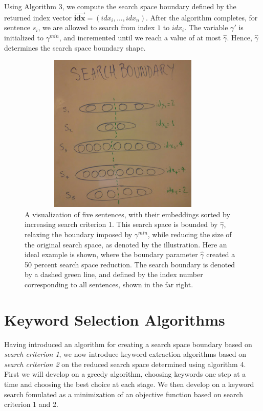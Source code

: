 \documentclass[12pt]{article}
\begin{document}
Using Algorithm 3, we compute the search space boundary defined by the returned index vector $\bm{\vec{idx}} = (idx_i, ..., idx_n)$. After the algorithm completes, for sentence $s_i$,  we are allowed to search from index $1$ to $idx_i$.
The variable $\gamma\prime$ is initialized to $\gamma^{min}$, and incremented until we reach a value of at most $\hat{\gamma}$. Hence, $\hat{\gamma}$ determines the search space boundary shape.

\begin{figure}[H]
\centering
\includegraphics[height=3in, width=4in]{Images/SearchBoundary.png}
\caption{A visualization of five sentences, with their embeddings sorted by increasing search criterion 1. This search space is bounded by $\hat{\gamma}$, relaxing the boundary imposed by $\gamma^{min}$, while reducing the size of the original search space, as denoted by the illustration. Here an ideal example is shown, where the boundary parameter $\hat{\gamma}$ created a 50 percent search space reduction. The search boundary is denoted by a dashed green line, and defined by the index number corresponding to all sentences, shown in the far right.}
\end{figure}


\section{Keyword Selection Algorithms}
Having introduced an algorithm for creating a search space boundary based on \textit{search criterion 1}, we now introduce keyword extraction algorithms based on \textit{search criterion 2} on the reduced search space determined using algorithm 4. First we will develop on a greedy algorithm, choosing keywords one step at a time and choosing the best choice at each stage. We then develop on a keyword search fomulated as a minimization of an objective function based on search criterion 1 and 2.
\end{document}
